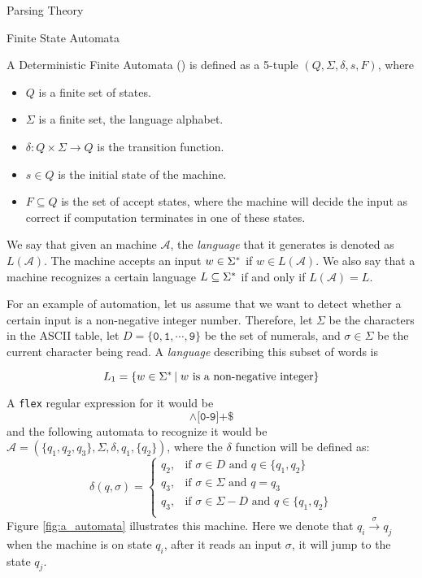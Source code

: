 \begin{section}{Parsing Theory}
\begin{subsection}{Finite State Automata}
\begin{definition}
A Deterministic Finite Automata () is defined as a 5-tuple
$(Q, \Sigma, \delta, s, F)$, where
\begin{itemize}

\item $Q$ is a finite set of states.
\item $\Sigma$ is a finite set, the language alphabet.
\item $\delta:Q\times\Sigma \longrightarrow Q$ is the transition function.
\item $s \in Q$ is the initial state of the machine.
\item $F \subseteq Q$ is the set of accept states, where the machine will
decide the input as correct if computation terminates in one of these
states.
\end{itemize}
\end{definition}

We say that given an machine $\mathcal{A}$, the \textit{language}
that it generates is denoted as $L(\mathcal{A})$. The machine accepts an input
$w \in \Sigma^*$ if $w \in L(\mathcal{A})$. We also say that a machine
recognizes a certain language $L \subseteq \Sigma^*$ if and only if
$L(\mathcal{A}) = L$.

For an example of automation, let us assume that we want to detect whether a
certain input is a non-negative integer number. Therefore, let $\Sigma$ be the
characters in the ASCII table, let $D = \{\texttt{0}, \texttt{1}, \cdots,
\texttt{9}\}$ be the set of numerals, and $\sigma \in \Sigma$ be the current
character being read. A \textit{language} describing this subset of words
is

$$ L_1 = \{w \in \Sigma^*\,|\;w \text{ is a non-negative integer}\}$$

A \texttt{flex} regular expression for it would be
$$\land\texttt{[0-9]+\$}$$
and the following automata to recognize it would be
$\mathcal{A} = (\{q_1, q_2, q_3\}, \Sigma, \delta, q_1, \{q_2\})$, where
the $\delta$ function will be defined as:
	\[
		\delta(q, \sigma) = \begin{cases}
		  q_2,& \text{if } \sigma \in D \text{ and } q \in \{q_1, q_2\} \\
		  q_3,& \text{if } \sigma \in \Sigma \text{ and } q = q_3 \\
		  q_3,& \text{if } \sigma \in \Sigma - D \text{ and } q \in \{q_1, q_2\} \\
		\end{cases} \nonumber
	\]
Figure \ref{fig:a_automata} illustrates this machine. Here we denote that
$q_i \overset{\sigma}{\longrightarrow} q_j$ when the machine is on state
$q_i$, after it reads an input $\sigma$, it will jump to the state $q_j$.


\end{subsection}
\end{section}
